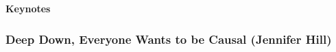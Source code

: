 \documentclass[letterpaper,11pt,oneside]{book} %
\begin{document}
\setlength{\parskip}{0pt}

%

\renewcommand{\contentsname}{\mbox{}\\[-108pt]\centering\textbf{\Large
    Table of Contents}\\[-10pt]}%
    
\cftchapnumwidth=0pt %
\tableofcontents
\cleardoublepage




{} 


\begin{center}
  {\Large \bf Keynotes}
\end{center}

\vspace*{0.5cm}
 

\hypertarget{deep-down-everyone-wants-to-be-causal-jennifer-hill}{%
\subsubsection{Deep Down, Everyone Wants to be Causal (Jennifer
Hill)}\label{deep-down-everyone-wants-to-be-causal-jennifer-hill}}
\end{document}
